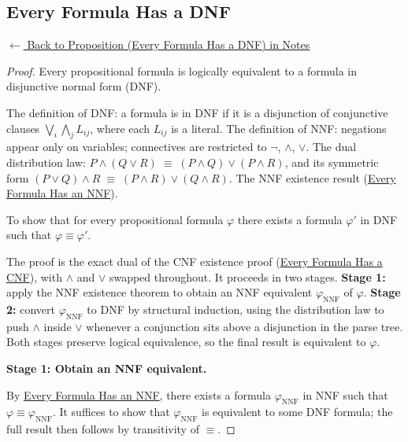 
\subsection*{Every Formula Has a DNF}
\label{prf:dnf-exists}

\begin{remark*}[Return]
\hyperref[prop:dnf-exists]{$\leftarrow$ Back to Proposition (Every Formula Has a DNF) in Notes}
\end{remark*}

\begin{proof}
\Claim Every propositional formula is logically equivalent to a formula in disjunctive normal form (DNF).

\Given The definition of DNF: a formula is in DNF if it is a disjunction of
conjunctive clauses $\bigvee_i \bigwedge_j L_{ij}$, where each $L_{ij}$ is a
literal. The definition of NNF: negations appear only on variables; connectives
are restricted to $\neg$, $\wedge$, $\vee$. The dual distribution law:
$P \wedge (Q \vee R) \;\equiv\; (P \wedge Q) \vee (P \wedge R)$, and its
symmetric form $(P \vee Q) \wedge R \;\equiv\; (P \wedge R) \vee (Q \wedge R)$.
The NNF existence result (\hyperref[prop:nnf-exists]{Every Formula Has an NNF}).

\Goal To show that for every propositional formula $\varphi$ there exists a
formula $\varphi'$ in DNF such that $\varphi \equiv \varphi'$.

\Strategy The proof is the exact dual of the CNF existence proof
(\hyperref[prop:cnf-exists]{Every Formula Has a CNF}), with $\wedge$ and $\vee$
swapped throughout. It proceeds in two stages. \textbf{Stage 1:} apply the NNF
existence theorem to obtain an NNF equivalent $\varphi_{\mathrm{NNF}}$ of
$\varphi$. \textbf{Stage 2:} convert $\varphi_{\mathrm{NNF}}$ to DNF by
structural induction, using the distribution law to push $\wedge$ inside $\vee$
whenever a conjunction sits above a disjunction in the parse tree. Both stages
preserve logical equivalence, so the final result is equivalent to $\varphi$.

\medskip
\noindent\textbf{Stage 1: Obtain an NNF equivalent.}

By \hyperref[prop:nnf-exists]{Every Formula Has an NNF}, there exists a formula
$\varphi_{\mathrm{NNF}}$ in NNF such that $\varphi \equiv
\varphi_{\mathrm{NNF}}$. It suffices to show that $\varphi_{\mathrm{NNF}}$ is
equivalent to some DNF formula; the full result then follows by transitivity of
$\equiv$.


\end{proof}
